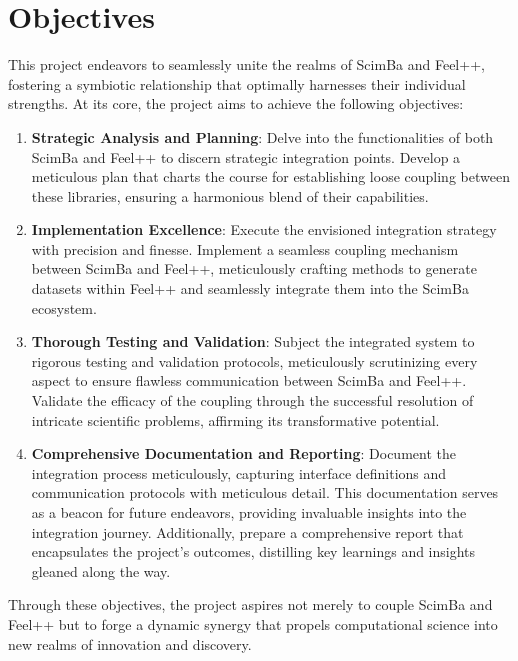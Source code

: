 \documentclass[12pt]{article}
\begin{document}
\section{Objectives}

This project endeavors to seamlessly unite the realms of ScimBa and Feel++, fostering a symbiotic relationship that optimally harnesses their individual strengths. At its core, the project aims to achieve the following objectives:

\begin{enumerate}
    \item \textbf{Strategic Analysis and Planning}: Delve into the functionalities of both ScimBa and Feel++ to discern strategic integration points. Develop a meticulous plan that charts the course for establishing loose coupling between these libraries, ensuring a harmonious blend of their capabilities.
    
    \item \textbf{Implementation Excellence}: Execute the envisioned integration strategy with precision and finesse. Implement a seamless coupling mechanism between ScimBa and Feel++, meticulously crafting methods to generate datasets within Feel++ and seamlessly integrate them into the ScimBa ecosystem.
    
    \item \textbf{Thorough Testing and Validation}: Subject the integrated system to rigorous testing and validation protocols, meticulously scrutinizing every aspect to ensure flawless communication between ScimBa and Feel++. Validate the efficacy of the coupling through the successful resolution of intricate scientific problems, affirming its transformative potential.
    
    \item \textbf{Comprehensive Documentation and Reporting}: Document the integration process meticulously, capturing interface definitions and communication protocols with meticulous detail. This documentation serves as a beacon for future endeavors, providing invaluable insights into the integration journey. Additionally, prepare a comprehensive report that encapsulates the project's outcomes, distilling key learnings and insights gleaned along the way.
\end{enumerate}

Through these objectives, the project aspires not merely to couple ScimBa and Feel++ but to forge a dynamic synergy that propels computational science into new realms of innovation and discovery.
\end{document}
